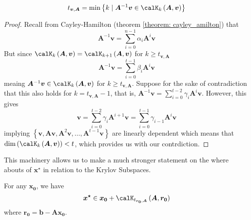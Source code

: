 \begin{cor} \label{theorem: grade_as_min}
    \[
        t_{\bm{v}, \bm{A}} = \min \left\{k \mid \bm{A}^{-1} \bm{v} \in \calK_{k} \left( \bm{A},\bm{v} \right) \right\}
    \]
\end{cor}
\begin{proof}
    Recall from Cayley-Hamilton (theorem \ref{theorem: cayley_amilton}) that
    \[
        \bm{A}^{-1} \bm{v} = \sum_{i=0}^{n-1} \alpha_{i} \bm{A}^{i} \bm{v}
    \]
    But since $\calK_{k} \left( \bm{A},\bm{v} \right) = \calK_{k+1} \left( \bm{A},\bm{v} \right)$ for $k \geq t_{\bm{v}, \bm{A}}$
    \[
        \bm{A}^{-1} \bm{v} = \sum_{i=0}^{t-1} \beta_{i} \bm{A}^{i} \bm{v}
    \]
    meaing $\bm{A}^{-1} \bm{v} \in \calK_{k} \left( \bm{A},\bm{v} \right)$ for $k \geq t_{\bm{v}, \bm{A}}$. Suppose for the sake of contradiction that this also holds for $k = t_{\bm{v}, \bm{A}} - 1$, that is, $\bm{A}^{-1} \bm{v} = \sum_{i=0}^{t-2} \gamma_{i} \bm{A}^{i} \bm{v}$. However, this gives
    \[
        \bm{v} = \sum_{i=0}^{t-2} \gamma_{i} \bm{A}^{i+1} \bm{v} = \sum_{i=0}^{t-1} \gamma_{i-1} \bm{A}^{i} \bm{v}
    \]
    implying $\left\{ \bm{v}, \bm{A} \bm{v}, \bm{A}^2 \bm{v}, \ldots , \bm{A}^{t-1} \bm{v} \right\}$ are linearly dependent which means that $\operatorname{dim} \left( \calK_{k} \left( \bm{A} , \bm{v} \right) \right) < t$, which provides us with our contrdiction.
\end{proof}
This machinery allows us to make a much stronger statement on the where abouts of $\bm{x^{\star}}$ in relation to the Krylov Subspaces.
\begin{cor} \label{theorem: sol_in_krylov}
    For any $\bm{x_0}$, we have
    \[
        \bm{x^{\star}} \in \bm{x_0} + \calK_{t_{\bm{r_0}, \bm{A}}} \left( \bm{A},\bm{r_0} \right)
    \]
    where $\bm{r_0} = \bm{b} - \bm{A} \bm{x_0}$.
\end{cor}